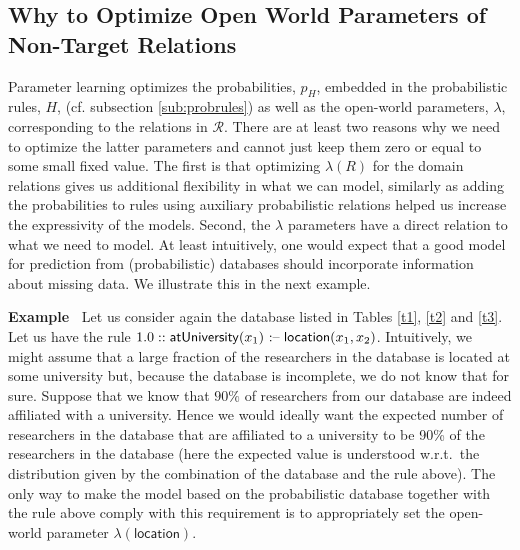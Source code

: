 \documentclass[akbc,twoside,11pt]{article}
\newcounter{example}
\newenvironment{example}[1][]{\refstepcounter{example}\par\medskip\noindent
   \textbf{Example~\theexample #1} \rmfamily}{\medskip}
\newcommand{\ondrej}[1]{\textcolor{red}{O: {#1}}}
\newcommand{\guy}[1]{\textcolor{red}{G: {#1}}}
\begin{document}
\iffalse %
\subsection{Why to Optimize Open World Parameters of Non-Target Relations}


Parameter learning optimizes the probabilities, $p_H$, embedded in the probabilistic rules, $H$, (cf. subsection \ref{sub:probrules}) %
as well as the open-world parameters, $\lambda$, corresponding to the relations in $\mathcal{R}$. There are at least two reasons why we need to optimize the latter parameters and cannot just keep them zero or equal to some small fixed value. The first is that optimizing $\lambda(R)$ for the domain relations gives us additional flexibility in what we can model, similarly as adding the probabilities to rules using auxiliary probabilistic relations helped us increase the expressivity of the models. Second, the $\lambda$ parameters have a direct relation to what we need to model. At least intuitively, one would expect that a good model for prediction from (probabilistic) databases should incorporate information about missing data. We illustrate this in the next example.

\begin{example}
Let us consider again the database listed in Tables \ref{t1}, \ref{t2} and \ref{t3}. Let us have the rule $1.0 :: \mathsf{atUniversity}(x_1) \mbox{ \textnormal{:--}}\; \mathsf{location}(x_1,x_2)$. Intuitively, we might assume that a large fraction of the researchers in the database is located at some university but, because the database is incomplete, we do not know that for sure. Suppose that we know that $90\%$ of researchers from our database are indeed affiliated with a university. Hence we would ideally want the expected number of researchers in the database that are affiliated to a university to be 90\% of the researchers in the database (here the expected value is understood w.r.t.\ the distribution given by the combination of the database and the rule above). The only way to make the model based on the probabilistic database together with the rule above comply with this requirement is to appropriately set the open-world parameter $\lambda(\mathsf{location})$.
\end{example}
\end{document}
